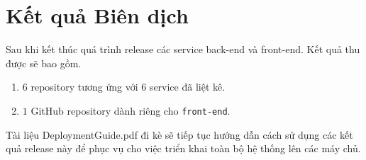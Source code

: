 \chapter{Kết quả Biên dịch}
\label{Chapter4}
Sau khi kết thúc quá trình release các service back-end và front-end. Kết quả thu được sẽ bao gồm.
\begin{enumerate}
    \item $6$ repository tương ứng với $6$ service đã liệt kê.
    \item $1$ GitHub repository dành riêng cho \texttt{front-end}.
\end{enumerate}
Tài liệu DeploymentGuide.pdf đi kè sẽ tiếp tục hướng dẫn cách sử dụng các kết quả release này để phục vụ cho việc triển khai toàn bộ hệ thống lên các máy chủ.

